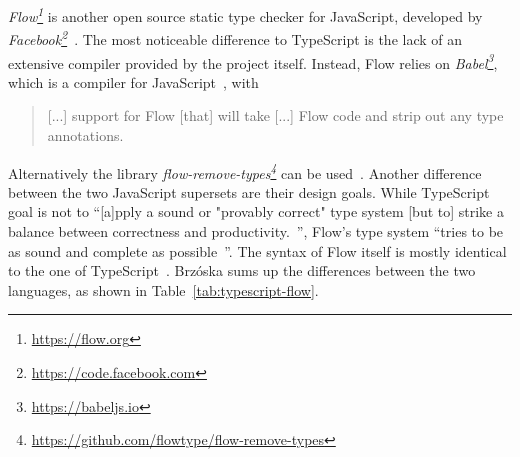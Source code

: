 \emph{Flow\footnote{\url{https://flow.org}}} is another open source static type checker for JavaScript, developed by \emph{Facebook\footnote{\url{https://code.facebook.com}}}~\cite{FacebookCode:Flow}. The most noticeable difference to TypeScript is the lack of an extensive compiler provided by the project itself. Instead, Flow relies on \emph{Babel\footnote{\url{https://babeljs.io}}}, which is a compiler for JavaScript~\cite{BabelWebsite}, with
\begin{quote}
  [...] support for Flow [that] will take [...] Flow code and strip out any type annotations.~\cite{FlowDocs:Install}
\end{quote}
Alternatively the library \emph{flow-remove-types\footnote{\url{https://github.com/flowtype/flow-remove-types}}} can be used~\cite{FlowDocs:Install}. Another difference between the two JavaScript supersets are their design goals. While TypeScript goal is not to ``[a]pply a sound or "provably correct" type system [but to] strike a balance between correctness and productivity.~\cite{TypeScriptWiki:DesignGoals}'', Flow's type system ``tries to be as sound and complete as possible~\cite{FlowDocs:TypesAndExpressions}''. The syntax of Flow itself is mostly identical to the one of TypeScript~\cite{FlowDocs:TypesAnnotations}. Brzóska sums up the differences between the two languages, as shown in Table~\ref{tab:typescript-flow}.
